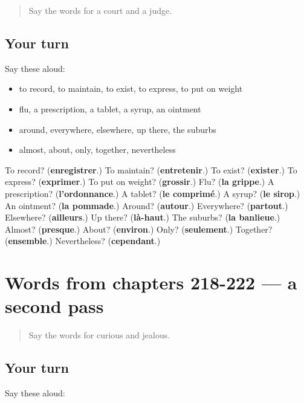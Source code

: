 \label{lesson:FR-R222-first-pass-words-from-chapters-214-217}



\begin{quote}
Say the words for a court and a judge.
\end{quote}

\subsection*{Your turn}
Say these aloud:

\begin{itemize}
\raggedright
  \item to record, to maintain, to exist, to express, to put on weight
  \item flu, a prescription, a tablet, a syrup, an ointment
  \item around, everywhere, elsewhere, up there, the suburbs
  \item almost, about, only, together, nevertheless
\end{itemize}

\begin{tcolorbox}[breakable,colback=teal!4,colframe=teal!35!black,title={Before you move on}]
To record? (\textbf{enregistrer}.) To maintain? (\textbf{entretenir}.) To exist? (\textbf{exister}.) To express? (\textbf{exprimer}.) To put on weight? (\textbf{grossir}.) Flu? (\textbf{la grippe}.) A prescription? (\textbf{l'ordonnance}.) A tablet? (\textbf{le comprimé}.) A syrup? (\textbf{le sirop}.) An ointment? (\textbf{la pommade}.) Around? (\textbf{autour}.) Everywhere? (\textbf{partout}.) Elsewhere? (\textbf{ailleurs}.) Up there? (\textbf{là-haut}.) The suburbs? (\textbf{la banlieue}.) Almost? (\textbf{presque}.) About? (\textbf{environ}.) Only? (\textbf{seulement}.) Together? (\textbf{ensemble}.) Nevertheless? (\textbf{cependant}.)
\end{tcolorbox}
\section[(dialogue)]{Words from chapters 218-222 — a second pass}

\label{lesson:FR-R222-second-pass-words-from-chapters-218-222}



\begin{quote}
Say the words for curious and jealous.
\end{quote}

\subsection*{Your turn}
Say these aloud:

